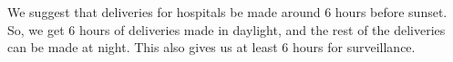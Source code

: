 We suggest that deliveries for hospitals be made around 6 hours before sunset. So, we get 6 hours of deliveries made in daylight, and the rest of the deliveries can be made at night. This also gives us at least 6 hours for surveillance. 


















 





